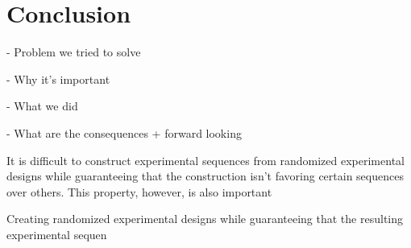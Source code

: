 \chapter{Conclusion}

- Problem we tried to solve

- Why it's important

- What we did

- What are the consequences + forward looking

It is difficult to construct experimental sequences from randomized experimental designs while guaranteeing that the construction isn't favoring certain sequences over others. This property, however, is also important 



Creating randomized experimental designs while guaranteeing that the resulting experimental sequen
